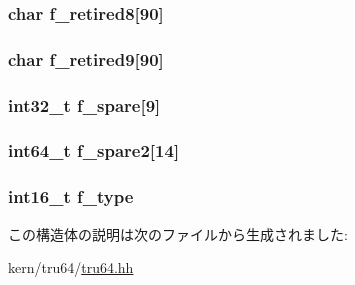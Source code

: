 \label{structTru64_1_1F64__statfs_ac661b4ce5e3520e496d66f18f006675f}
\hypertarget{structTru64_1_1F64__statfs_a745b6e9de6a420725894d700cb8312c5}{
\subsubsection[{f\_\-retired8}]{\setlength{\rightskip}{0pt plus 5cm}char {\bf f\_\-retired8}\mbox{[}90\mbox{]}}}
\label{structTru64_1_1F64__statfs_a745b6e9de6a420725894d700cb8312c5}
\hypertarget{structTru64_1_1F64__statfs_a9ef784491081d55fba5bcba4daf7f251}{
\subsubsection[{f\_\-retired9}]{\setlength{\rightskip}{0pt plus 5cm}char {\bf f\_\-retired9}\mbox{[}90\mbox{]}}}
\label{structTru64_1_1F64__statfs_a9ef784491081d55fba5bcba4daf7f251}
\hypertarget{structTru64_1_1F64__statfs_a8ade6b3791688e640ffe1f5c4960ff4b}{
\subsubsection[{f\_\-spare}]{\setlength{\rightskip}{0pt plus 5cm}int32\_\-t {\bf f\_\-spare}\mbox{[}9\mbox{]}}}
\label{structTru64_1_1F64__statfs_a8ade6b3791688e640ffe1f5c4960ff4b}
\hypertarget{structTru64_1_1F64__statfs_a87d442af5cc940ec998224826a9230bd}{
\subsubsection[{f\_\-spare2}]{\setlength{\rightskip}{0pt plus 5cm}int64\_\-t {\bf f\_\-spare2}\mbox{[}14\mbox{]}}}
\label{structTru64_1_1F64__statfs_a87d442af5cc940ec998224826a9230bd}
\hypertarget{structTru64_1_1F64__statfs_aa0722a16ad0079be617958da83f98ce0}{
\subsubsection[{f\_\-type}]{\setlength{\rightskip}{0pt plus 5cm}int16\_\-t {\bf f\_\-type}}}
\label{structTru64_1_1F64__statfs_aa0722a16ad0079be617958da83f98ce0}


この構造体の説明は次のファイルから生成されました:\begin{DoxyCompactItemize}
\item 
kern/tru64/\hyperlink{kern_2tru64_2tru64_8hh}{tru64.hh}\end{DoxyCompactItemize}
